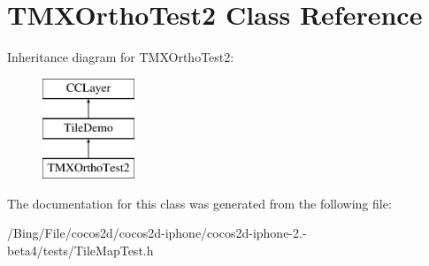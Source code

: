 \hypertarget{interface_t_m_x_ortho_test2}{\section{T\-M\-X\-Ortho\-Test2 Class Reference}
\label{interface_t_m_x_ortho_test2}
}
Inheritance diagram for T\-M\-X\-Ortho\-Test2\-:\begin{figure}[H]
\begin{center}
\leavevmode
\includegraphics[height=3.000000cm]{interface_t_m_x_ortho_test2}
\end{center}
\end{figure}


The documentation for this class was generated from the following file\-:\begin{DoxyCompactItemize}
\item 
/\-Bing/\-File/cocos2d/cocos2d-\/iphone/cocos2d-\/iphone-\/2.-\/beta4/tests/Tile\-Map\-Test.\-h\end{DoxyCompactItemize}

